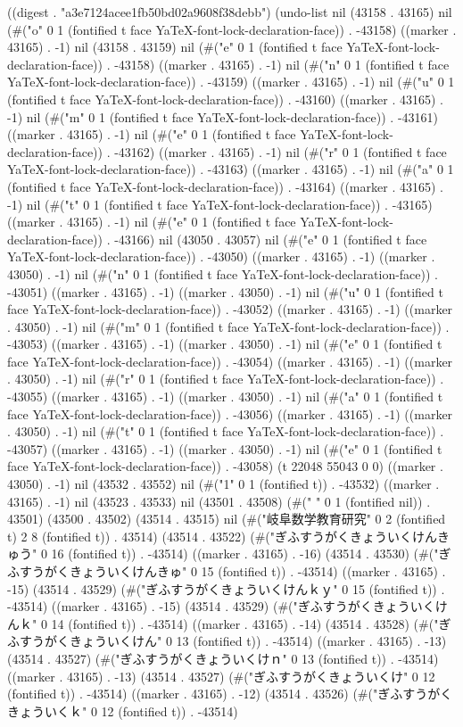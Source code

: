 
((digest . "a3e7124acee1fb50bd02a9608f38debb") (undo-list nil (43158 . 43165) nil (#("o" 0 1 (fontified t face YaTeX-font-lock-declaration-face)) . -43158) ((marker . 43165) . -1) nil (43158 . 43159) nil (#("e" 0 1 (fontified t face YaTeX-font-lock-declaration-face)) . -43158) ((marker . 43165) . -1) nil (#("n" 0 1 (fontified t face YaTeX-font-lock-declaration-face)) . -43159) ((marker . 43165) . -1) nil (#("u" 0 1 (fontified t face YaTeX-font-lock-declaration-face)) . -43160) ((marker . 43165) . -1) nil (#("m" 0 1 (fontified t face YaTeX-font-lock-declaration-face)) . -43161) ((marker . 43165) . -1) nil (#("e" 0 1 (fontified t face YaTeX-font-lock-declaration-face)) . -43162) ((marker . 43165) . -1) nil (#("r" 0 1 (fontified t face YaTeX-font-lock-declaration-face)) . -43163) ((marker . 43165) . -1) nil (#("a" 0 1 (fontified t face YaTeX-font-lock-declaration-face)) . -43164) ((marker . 43165) . -1) nil (#("t" 0 1 (fontified t face YaTeX-font-lock-declaration-face)) . -43165) ((marker . 43165) . -1) nil (#("e" 0 1 (fontified t face YaTeX-font-lock-declaration-face)) . -43166) nil (43050 . 43057) nil (#("e" 0 1 (fontified t face YaTeX-font-lock-declaration-face)) . -43050) ((marker . 43165) . -1) ((marker . 43050) . -1) nil (#("n" 0 1 (fontified t face YaTeX-font-lock-declaration-face)) . -43051) ((marker . 43165) . -1) ((marker . 43050) . -1) nil (#("u" 0 1 (fontified t face YaTeX-font-lock-declaration-face)) . -43052) ((marker . 43165) . -1) ((marker . 43050) . -1) nil (#("m" 0 1 (fontified t face YaTeX-font-lock-declaration-face)) . -43053) ((marker . 43165) . -1) ((marker . 43050) . -1) nil (#("e" 0 1 (fontified t face YaTeX-font-lock-declaration-face)) . -43054) ((marker . 43165) . -1) ((marker . 43050) . -1) nil (#("r" 0 1 (fontified t face YaTeX-font-lock-declaration-face)) . -43055) ((marker . 43165) . -1) ((marker . 43050) . -1) nil (#("a" 0 1 (fontified t face YaTeX-font-lock-declaration-face)) . -43056) ((marker . 43165) . -1) ((marker . 43050) . -1) nil (#("t" 0 1 (fontified t face YaTeX-font-lock-declaration-face)) . -43057) ((marker . 43165) . -1) ((marker . 43050) . -1) nil (#("e" 0 1 (fontified t face YaTeX-font-lock-declaration-face)) . -43058) (t 22048 55043 0 0) ((marker . 43050) . -1) nil (43532 . 43552) nil (#("1" 0 1 (fontified t)) . -43532) ((marker . 43165) . -1) nil (43523 . 43533) nil (43501 . 43508) (#(" " 0 1 (fontified nil)) . 43501) (43500 . 43502) (43514 . 43515) nil (#("岐阜数学教育研究" 0 2 (fontified t) 2 8 (fontified t)) . 43514) (43514 . 43522) (#("ぎふすうがくきょういくけんきゅう" 0 16 (fontified t)) . -43514) ((marker . 43165) . -16) (43514 . 43530) (#("ぎふすうがくきょういくけんきゅ" 0 15 (fontified t)) . -43514) ((marker . 43165) . -15) (43514 . 43529) (#("ぎふすうがくきょういくけんｋｙ" 0 15 (fontified t)) . -43514) ((marker . 43165) . -15) (43514 . 43529) (#("ぎふすうがくきょういくけんｋ" 0 14 (fontified t)) . -43514) ((marker . 43165) . -14) (43514 . 43528) (#("ぎふすうがくきょういくけん" 0 13 (fontified t)) . -43514) ((marker . 43165) . -13) (43514 . 43527) (#("ぎふすうがくきょういくけｎ" 0 13 (fontified t)) . -43514) ((marker . 43165) . -13) (43514 . 43527) (#("ぎふすうがくきょういくけ" 0 12 (fontified t)) . -43514) ((marker . 43165) . -12) (43514 . 43526) (#("ぎふすうがくきょういくｋ" 0 12 (fontified t)) . -43514) 